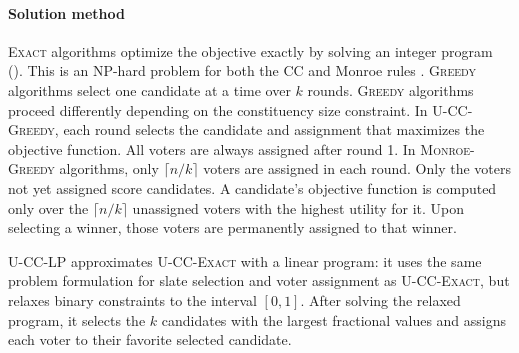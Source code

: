 \documentclass[letterpaper]{article} %
\newcommand{\Exact}{\textsc{U-CC-Exact}}
\newcommand{\Greedy}{\textsc{U-CC-Greedy}}
\newcommand{\LP}{\textsc{U-CC-LP}}
\begin{document}
\paragraph{Solution method}
\textsc{Exact} algorithms optimize the objective exactly by solving an integer program ().
This is an NP-hard problem for both the CC and Monroe rules \citep{lu-boutilier-2011, procaccia-2008}.
\textsc{Greedy} algorithms select one candidate at a time over \(k\) rounds.
\textsc{Greedy} algorithms proceed differently depending on the constituency size constraint.
In \Greedy, each round selects the candidate and assignment that maximizes the objective function.
All voters are always assigned after round 1.
In \textsc{Monroe-Greedy} algorithms, only \(\lceil n/k\rceil\) voters are assigned in each round.\footnotemark{}
Only the voters not yet assigned score candidates.
A candidate's objective function is computed only over the \(\lceil n/k\rceil\) unassigned voters with the highest utility for it.\footnotemark[\value{footnote}]
Upon selecting a winner, those voters are permanently assigned to that winner.

\LP{} approximates \Exact{} with a linear program: it uses the same problem formulation for slate selection and voter assignment as \Exact{},
but relaxes binary constraints to the interval \([0,1]\).
After solving the relaxed program, it selects the \(k\) candidates with the largest fractional values and assigns each voter to their favorite selected candidate.
\end{document}
